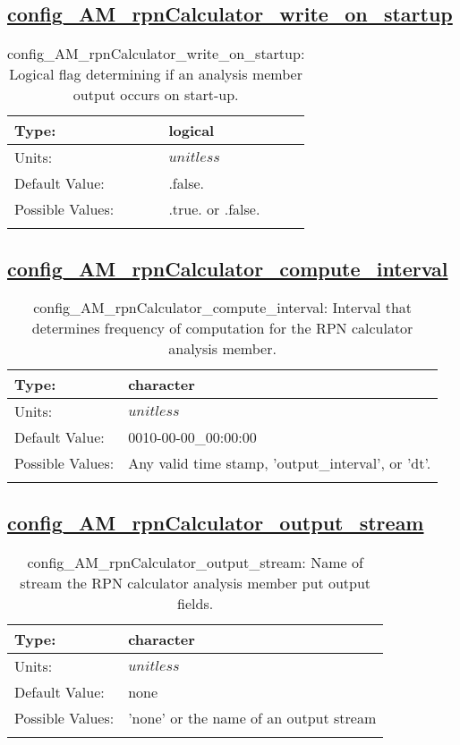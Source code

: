 \subsection[config\_AM\_rpnCalculator\_write\_on\_startup]{\hyperref[sec:nm_tab_AM_rpnCalculator]{config\_AM\_rpnCalculator\_write\_on\_startup}}
\label{subsec:nm_sec_config_AM_rpnCalculator_write_on_startup}
\begin{center}
\begin{longtable}{| p{2.0in} || p{4.0in} |}
    \hline
    Type: & logical \\
    \hline
    Units: & $unitless$ \\
    \hline
    Default Value: & .false. \\
    \hline
    Possible Values: & .true. or .false. \\
    \hline
    \caption{config\_AM\_rpnCalculator\_write\_on\_startup: Logical flag determining if an analysis member output occurs on start-up.}
\end{longtable}
\end{center}
\subsection[config\_AM\_rpnCalculator\_compute\_interval]{\hyperref[sec:nm_tab_AM_rpnCalculator]{config\_AM\_rpnCalculator\_compute\_interval}}
\label{subsec:nm_sec_config_AM_rpnCalculator_compute_interval}
\begin{center}
\begin{longtable}{| p{2.0in} || p{4.0in} |}
    \hline
    Type: & character \\
    \hline
    Units: & $unitless$ \\
    \hline
    Default Value: & 0010-00-00\_00:00:00 \\
    \hline
    Possible Values: & Any valid time stamp, 'output\_interval', or 'dt'. \\
    \hline
    \caption{config\_AM\_rpnCalculator\_compute\_interval: Interval that determines frequency of computation for the RPN calculator analysis member.}
\end{longtable}
\end{center}
\subsection[config\_AM\_rpnCalculator\_output\_stream]{\hyperref[sec:nm_tab_AM_rpnCalculator]{config\_AM\_rpnCalculator\_output\_stream}}
\label{subsec:nm_sec_config_AM_rpnCalculator_output_stream}
\begin{center}
\begin{longtable}{| p{2.0in} || p{4.0in} |}
    \hline
    Type: & character \\
    \hline
    Units: & $unitless$ \\
    \hline
    Default Value: & none \\
    \hline
    Possible Values: & 'none' or the name of an output stream \\
    \hline
    \caption{config\_AM\_rpnCalculator\_output\_stream: Name of stream the RPN calculator analysis member put output fields.}
\end{longtable}
\end{center}
